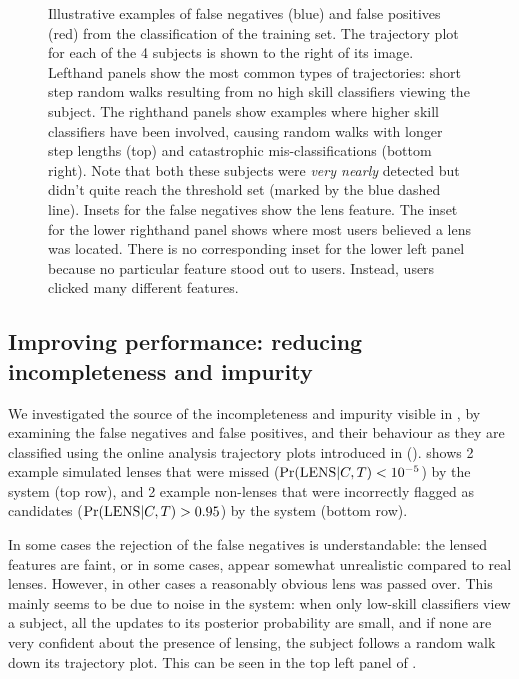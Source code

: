 \documentclass[useAMS,usenatbib,a4paper]{mn2e}
\begin{document}
\begin{figure}
\begin{minipage}{\linewidth}
\begin{minipage}[t]{0.47\linewidth}
\begin{minipage}{0.50\linewidth}
    \end{minipage}
  \end{minipage}
\end{minipage}
\caption{Illustrative examples of
false negatives (blue) and false positives (red) from the classification of
the \SW \cfhtls training set. The trajectory plot for each of the 4 subjects is
shown to the right of its image. Lefthand panels show the most common types of
trajectories: short step random walks resulting from no high skill classifiers
viewing the subject. The righthand panels show examples where higher skill
classifiers have been involved, causing random walks with longer step lengths
(top) and catastrophic mis-classifications (bottom right). Note that both these
subjects were {\it very nearly} detected but didn't quite reach the threshold
set (marked by the blue dashed line). Insets for the false
negatives show the lens feature. The inset for the lower righthand panel shows
where most users believed a lens was located. There is no corresponding inset
for the lower left panel because no particular feature stood out to users.
Instead, users clicked many different features.}
\label{fig:discuss:performance:trajectories}
\end{figure}

\subsection{Improving performance: reducing incompleteness and impurity}
\label{sec:discuss:performance}

We investigated the source of the incompleteness and impurity visible in
, by examining the \StageTwo false negatives and
false positives, and their behaviour as they are classified using the online
analysis trajectory plots introduced in 
().
 shows 2 example simulated lenses
that were missed (${\rm Pr}({\rm LENS}|C,T) < 10^{-5}$) by the \SW system (top row),
and 2 example
non-lenses that were incorrectly flagged as candidates (${\rm Pr}({\rm LENS}|C,T) >
0.95$) by the \SW system (bottom row).

In some cases the rejection of the false negatives is understandable: the
lensed features are faint, or in some cases, appear somewhat unrealistic compared to real lenses.
However, in other cases a reasonably obvious lens was passed over.  This
mainly seems to be due to noise in the system: when only low-skill classifiers
view a subject, all the updates to its posterior probability are small, and if
none are very confident about the presence of lensing, the subject follows a
random walk down its trajectory plot. This can be seen in the top left panel
of .
\end{document}
